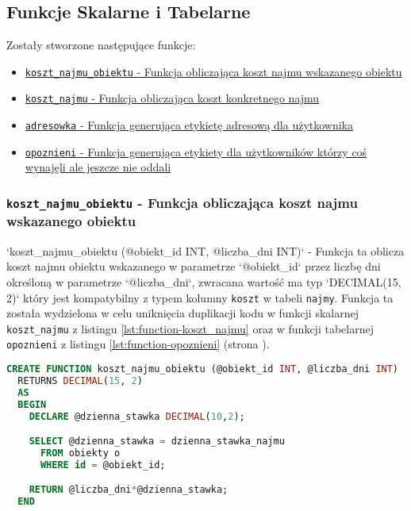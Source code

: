 \subsection{Funkcje Skalarne i Tabelarne}

Zostały stworzone następujące funkcje:
\begin{itemize}
	\item \href{run:Sources/SQL/3. Funkcje Skalarne/017_Utworzenie_funkcji_wyliczajacej_koszt_najmu_obiektu.sql}{\texttt{koszt\_najmu\_obiektu} - Funkcja obliczająca koszt najmu wskazanego obiektu}
	\item \href{run:Sources/SQL/3. Funkcje Skalarne/018_Utworzenie_funkcji_wyliczajacej_koszt_konkretnego_najmu.sql}{\texttt{koszt\_najmu} - Funkcja obliczająca koszt konkretnego najmu}
	\item \href{run:Sources/SQL/3. Funkcje Skalarne/020_Utworzenie_funkcji_wyswietlajacej_adresowke_uzytkownika.sql}{\texttt{adresowka} - Funkcja generująca etykietę adresową dla użytkownika}
	\item \href{run:Sources/SQL/4. Funkcje Tabelarne/021_Utworzenie_funkcji_wyswietlajacej_spozniajacych_sie_uzytkownikow.sql}{\texttt{opoznieni} - Funkcja generująca etykiety dla użytkowników którzy coś wynajęli ale jeszcze nie oddali}
\end{itemize}

\subsubsection{\texttt{koszt\_najmu\_obiektu} - Funkcja obliczająca koszt najmu wskazanego obiektu}

`koszt_najmu_obiektu (@obiekt_id INT, @liczba_dni INT)` - Funkcja ta oblicza koszt najmu obiektu wskazanego w parametrze `@obiekt_id` przez liczbę dni określoną w parametrze `@liczba_dni`, zwracana wartość ma typ `DECIMAL(15, 2)` który jest kompatybilny z typem kolumny \texttt{koszt} w tabeli \texttt{najmy}. Funkcja ta została wydzielona w celu uniknięcia duplikacji kodu w funkcji skalarnej \texttt{koszt\_najmu} z listingu \ref{lst:function-koszt_najmu} oraz w funkcji tabelarnej \texttt{opoznieni} z listingu \ref{lst:function-opoznieni} (strona \pageref{lst:function-opoznieni}).

\begin{lstlisting}[language=SQL, caption={Skrypt tworzący funkcję skalarną \texttt{koszt\_najmu\_obiektu}}, label={lst:function-koszt_najmu_obiektu}]
CREATE FUNCTION koszt_najmu_obiektu (@obiekt_id INT, @liczba_dni INT)
  RETURNS DECIMAL(15, 2)
  AS
  BEGIN
    DECLARE @dzienna_stawka DECIMAL(10,2);

    SELECT @dzienna_stawka = dzienna_stawka_najmu
      FROM obiekty o
      WHERE id = @obiekt_id;

    RETURN @liczba_dni*@dzienna_stawka;
  END
\end{lstlisting}

